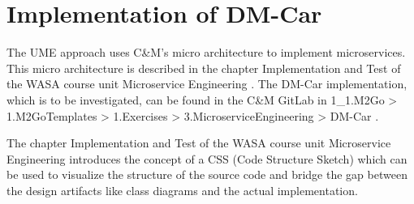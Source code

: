 
\section{Implementation of DM-Car}
\label{sec:m2g_exercise}

The UME approach uses C\&M's micro architecture to implement microservices.
This micro architecture is described in the chapter Implementation and Test of
the WASA course unit Microservice Engineering \cite{CM-W-IMP}. The DM-Car implementation, which
is to be investigated, can be found in the C\&M GitLab in 1\_1.M2Go >
1.M2GoTemplates > 1.Exercises > 3.MicroserviceEngineering > DM-Car \cite{CM-G-DMC}.


The chapter Implementation and Test of the WASA course unit Microservice Engineering \cite{CM-W-IMP}
introduces the concept of a CSS (Code Structure Sketch) which can be used
to visualize the structure of the source code and bridge the gap between the design
artifacts like class diagrams and the actual implementation.

